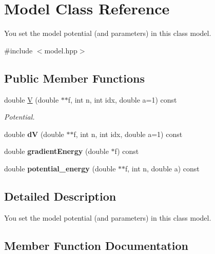 \hypertarget{class_model}{}\section{Model Class Reference}
\label{class_model}


You set the model potential (and parameters) in this class model.  




{\ttfamily \#include $<$model.\+hpp$>$}

\subsection*{Public Member Functions}
\begin{DoxyCompactItemize}
\item 
double \mbox{\hyperlink{class_model_ac370fd0b6e71231998e012480f30c4c1}{V}} (double $\ast$$\ast$f, int n, int idx, double a=1) const
\begin{DoxyCompactList}\small\item\em Potential. \end{DoxyCompactList}\item 
\mbox{\label{class_model_aed8016aa38d39bd83cbe222119589044}} 
double {\bfseries dV} (double $\ast$$\ast$f, int n, int idx, double a=1) const
\item 
\mbox{\label{class_model_af463b3898ec29efe8e2a5ad14bdc2be1}} 
double {\bfseries gradient\+Energy} (double $\ast$f) const
\item 
\mbox{\label{class_model_a7a0097d2525a387a190736edf97be723}} 
double {\bfseries potential\+\_\+energy} (double $\ast$$\ast$f, int n, double a) const
\end{DoxyCompactItemize}


\subsection{Detailed Description}
You set the model potential (and parameters) in this class model. 

\subsection{Member Function Documentation}
\mbox{\label{class_model_ac370fd0b6e71231998e012480f30c4c1}} 
